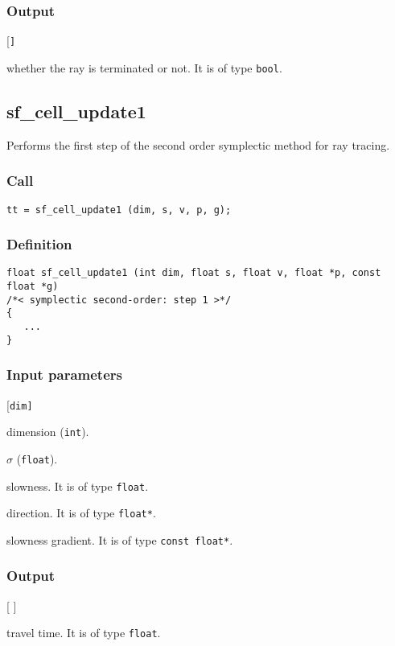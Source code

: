 \subsubsection*{Output}
\begin{desclist}{\tt }{\quad}[\tt ]
   \setlength\itemsep{0pt}  
   \item[true/false] whether the ray is terminated or not. It is of type \texttt{bool}.
\end{desclist}




\subsection{{sf\_cell\_update1}}
Performs the first step of the second order symplectic method for ray tracing.


\subsubsection*{Call}
\begin{verbatim}tt = sf_cell_update1 (dim, s, v, p, g);\end{verbatim}

\subsubsection*{Definition}
\begin{verbatim}
float sf_cell_update1 (int dim, float s, float v, float *p, const float *g) 
/*< symplectic second-order: step 1 >*/
{
   ...
}
\end{verbatim}

\subsubsection*{Input parameters}
\begin{desclist}{\tt }{\quad}[\tt dim]
   \setlength\itemsep{0pt}
   \item[dim] dimension (\texttt{int}).  
   \item[s]   $\sigma$ (\texttt{float}).
   \item[v]   slowness. It is of type \texttt{float}.
   \item[p]   direction. It is of type \texttt{float*}.
   \item[g]   slowness gradient. It is of type \texttt{const float*}.
\end{desclist}

\subsubsection*{Output}
\begin{desclist}{\tt }{\quad}[ ]
   \setlength\itemsep{0pt}  
   \item[0.5*v*v*s*(1. + s*pg)] travel time. It is of type \texttt{float}.
\end{desclist}




